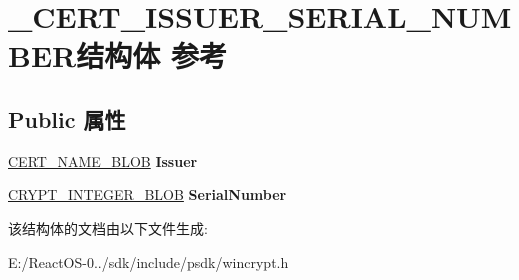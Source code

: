 \hypertarget{struct___c_e_r_t___i_s_s_u_e_r___s_e_r_i_a_l___n_u_m_b_e_r}{}\section{\+\_\+\+C\+E\+R\+T\+\_\+\+I\+S\+S\+U\+E\+R\+\_\+\+S\+E\+R\+I\+A\+L\+\_\+\+N\+U\+M\+B\+E\+R结构体 参考}
\label{struct___c_e_r_t___i_s_s_u_e_r___s_e_r_i_a_l___n_u_m_b_e_r}
\subsection*{Public 属性}
\begin{DoxyCompactItemize}
\item 
\mbox{\label{struct___c_e_r_t___i_s_s_u_e_r___s_e_r_i_a_l___n_u_m_b_e_r_ae4cc1e63475406c4ea6705ebe5c6cd49}} 
\hyperlink{struct___c_r_y_p_t_o_a_p_i___b_l_o_b}{C\+E\+R\+T\+\_\+\+N\+A\+M\+E\+\_\+\+B\+L\+OB} {\bfseries Issuer}
\item 
\mbox{\label{struct___c_e_r_t___i_s_s_u_e_r___s_e_r_i_a_l___n_u_m_b_e_r_af72435fe3a4a593ec7d609f6c7c9008e}} 
\hyperlink{struct___c_r_y_p_t_o_a_p_i___b_l_o_b}{C\+R\+Y\+P\+T\+\_\+\+I\+N\+T\+E\+G\+E\+R\+\_\+\+B\+L\+OB} {\bfseries Serial\+Number}
\end{DoxyCompactItemize}


该结构体的文档由以下文件生成\+:\begin{DoxyCompactItemize}
\item 
E\+:/\+React\+O\+S-\/0../sdk/include/psdk/wincrypt.\+h\end{DoxyCompactItemize}
